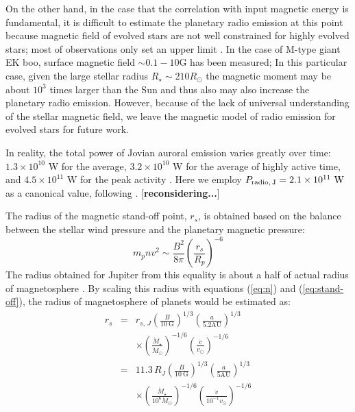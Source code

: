 \documentclass{emulateapj}
\def\memoYF#1{\color{red}$[${\bf #1}$]$ \color{black}}
\begin{document}
On the other hand, in the case that the correlation with input magnetic energy is fundamental, it is difficult to estimate the planetary radio emission at this point because magnetic field of evolved stars are not well constrained for highly evolved stars; most of observations only set an upper limit \citep[e.g.,][]{konstantinova2010,petit2013,tsvetkova2013,konstantinova2013,auriere2015}. 
In the case of M-type giant EK boo, surface magnetic field $\sim 0.1-10 $G has been measured; In this particular case, given the large stellar radius $R_\star \sim 210 R_{\odot }$ the magnetic moment may be about $10^3$ times larger than the Sun and thus also may also increase the planetary radio emission. However, because of the lack of universal understanding of the stellar magnetic field, we leave the magnetic model of radio emission for evolved stars for future work. 

In reality, the total power of Jovian auroral emission varies greatly over time: $1.3\times 10^{10}$ W for the average, $3.2\times 10^{10}$ W for the average of highly active time, and $4.5 \times 10^{11}$ W for the peak activity \citep{zarka_et_al2004}. 
Here we employ $P_{\rm radio,\,J}=2.1\times 10^{11}\mbox{~W}$ as a canonical value, following \citet{griesmeier2005,griesmeier2007b}.
\memoYF{reconsidering...}

The radius of the magnetic stand-off point, $r_s$, is obtained based on the balance between the stellar wind pressure and the planetary magnetic pressure: 
\begin{equation}
m_p n v ^2 \sim \frac{B^2}{8\pi}\left( \frac{r_s}{R_p} \right)^{-6}  \label{eq:stand-off}
\end{equation}
The radius obtained for Jupiter from this equality is about a half of actual radius of magnetosphere \citep[][]{griesmeier2005}. 
By scaling this radius with equations (\ref{eq:n}) and (\ref{eq:stand-off}), the radius of magnetosphere of planets would be estimated as:
\begin{eqnarray}
\nonumber r_s 
&=& r_{s,\,J} \left( \frac{B}{10~\mbox{G}} \right)^{1/3} \left( \frac{a}{5.2\mbox{AU}} \right)^{1/3}  \\
&& \times \left( \frac{\dot M_\star}{\dot M_\odot} \right)^{-1/6}  \left( \frac{\dot v}{v_{\odot }} \right)^{-1/6} \\
\nonumber &=& 11.3 \, R_J \left( \frac{B}{10~\mbox{G}} \right)^{1/3}  \left( \frac{a}{5\mbox{AU}} \right)^{1/3} \\
&& \times \left( \frac{\dot M_\star}{10^6 \dot M_\odot} \right)^{-1/6}  \left( \frac{\dot v}{10^{-1}v_{\odot }} \right)^{-1/6}
 \label{eq:stand-off-radius}
\end{eqnarray}
\end{document}
